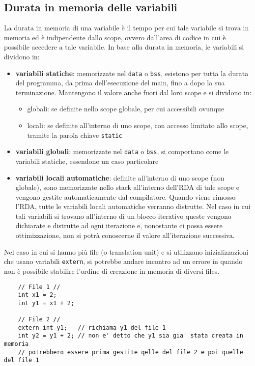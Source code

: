 \documentclass[a4paper]{article}
\begin{document}
\subsection{Durata in memoria delle variabili}
La durata in memoria di una variabile è il tempo per cui tale variabile si trova in memoria ed è indipendente dallo scope,
ovvero dall'area di codice in cui è possibile accedere a tale variabile. In base alla durata in memoria, le variabili si
dividono in:
\begin{itemize}
	\item \textbf{variabili statiche}: memorizzate nel \verb|data| o \verb|bss|, esistono per tutta la durata del programma,
	da prima dell'esecuzione del main, fino a dopo la sua terminazione. Mantengono il valore anche fuori dal loro scope e si
	dividono in:
	\begin{itemize}[topsep=0pt]
		\item globali: se definite nello scope globale, per cui accessibili ovunque
		\item locali: se definite all'interno di uno scope, con accesso limitato allo scope, tramite la parola chiave \verb|static|
	\end{itemize}
	\item \textbf{variabili globali}: memorizzate nel \verb|data| o \verb|bss|, si comportano come le variabili statiche,
	essendone un caso particolare
	\item \textbf{variabili locali automatiche}: definite all'interno di uno scope (non globale), sono memorizzate nello stack
	all'interno dell'RDA di tale scope e vengono gestite automaticamente dal compilatore. Quando viene rimosso l'RDA, tutte le
	variabili locali automatiche verranno distrutte. Nel caso in cui tali variabili si trovano all'interno di un blocco iterativo
	queste vengono dichiarate e distrutte ad ogni iterazione e, nonostante ci possa essere ottimizzazione, non si potrà conoscerne
	il valore all'iterazione successiva.
\end{itemize}

Nel caso in cui si hanno più file (o translation unit) e si utilizzano inizializzazioni che usano variabili \verb|extern|, si
potrebbe andare incontro ad un errore in quando non è possibile stabilire l'ordine di creazione in memoria di diversi files.
\begin{lstlisting}
	// File 1 //
	int x1 = 2;
	int y1 = x1 + 2;

	// File 2 //
	extern int y1;   // richiama y1 del file 1
	int y2 = y1 + 2; // non e' detto che y1 sia gia' stata creata in memoria
	// potrebbero essere prima gestite qelle del file 2 e poi quelle del file 1
\end{lstlisting}
\end{document}
